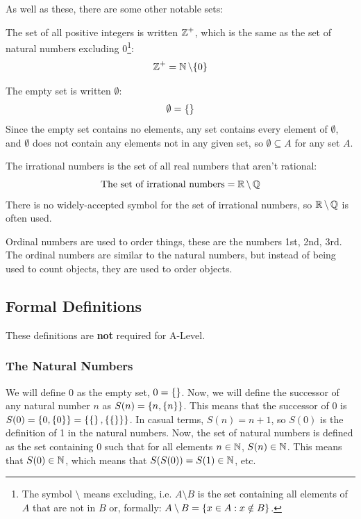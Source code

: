         As well as these, there are some other notable sets:

        The set of all positive integers is written $\operatorname{\mathbb{Z}}^+$, which is the same as the set of natural numbers excluding 0\footnote{The symbol $\setminus$ means excluding, i.e. $A\setminus B$ is the set containing all elements of $A$ that are not in $B$ or, formally: $A\setminus B=\left\{x\in A:x\notin B\right\}$.}:
        \begin{equation}
            \operatorname{\mathbb{Z}}^+=\operatorname{\mathbb{N}}\setminus\{0\}
        \end{equation}
        
        The empty set is written $\emptyset$:
        \begin{equation}
            \emptyset=\left\{\right\}
        \end{equation}
        Since the empty set contains no elements, any set contains every element of $\emptyset$, and $\emptyset$ does not contain any elements not in any given set, so $\emptyset\subseteq A$ for any set $A$.

        The irrational numbers is the set of all real numbers that aren't rational:
        \begin{equation}
            \text{The set of irrational numbers}=\operatorname{\mathbb{R}}\setminus\operatorname{\mathbb{Q}}
        \end{equation}
        There is no widely-accepted symbol for the set of irrational numbers, so $\operatorname{\mathbb{R}}\setminus\operatorname{\mathbb{Q}}$ is often used.

        Ordinal numbers are used to order things, these are the numbers 1st, 2nd, 3rd.
        The ordinal numbers are similar to the natural numbers, but instead of being used to count objects, they are used to order objects.

    \subsection{Formal Definitions} %
        These definitions are \textbf{not} required for A-Level.

        \subsubsection{The Natural Numbers}
            We will define 0 as the empty set, $0=\left\{\right\}$.
            Now, we will define the successor of any natural number $n$ as $S(n)=\left\{n, \left\{n\right\}\right\}$.
            This means that the successor of 0 is $S(0)=\left\{0, \left\{0\right\}\right\}=\left\{\left\{\right\}, \left\{\left\{\right\}\right\}\right\}$.
            In casual terms, $S(n)=n+1$, so $S(0)$ is the definition of 1 in the natural numbers.
            Now, the set of natural numbers is defined as the set containing 0 such that for all elements $n\in\operatorname{\mathbb{N}}$, $S(n)\in\operatorname{\mathbb{N}}$.
            This means that $S(0)\in\operatorname{\mathbb{N}}$, which means that $S(S(0))=S(1)\in\operatorname{\mathbb{N}}$, etc.

